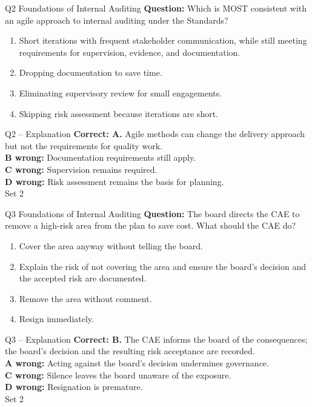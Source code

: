 \documentclass[aspectratio=169,10pt]{beamer}
\begin{document}
\begin{frame}[t]{Q2 \hfill {\scriptsize Foundations of Internal Auditing}}
	\small
	\textbf{Question:} Which is MOST consistent with an agile approach to internal auditing under the Standards?
	\begin{enumerate}[label=\Alph*.,itemsep=1pt,topsep=3pt]
			\item Short iterations with frequent stakeholder communication, while still meeting requirements for supervision, evidence, and documentation.
			\item Dropping documentation to save time.
			\item Eliminating supervisory review for small engagements.
			\item Skipping risk assessment because iterations are short.
	\end{enumerate}
\end{frame}

\begin{frame}[t]{Q2 -- Explanation}
	\footnotesize
	\textbf{Correct: A.} Agile methods can change the delivery approach but not the requirements for quality work. \\[5pt]
\textbf{B wrong:} Documentation requirements still apply. \\[3pt]
\textbf{C wrong:} Supervision remains required. \\[3pt]
\textbf{D wrong:} Risk assessment remains the basis for planning. \\[3pt]
	\vfill {\tiny Set 2}
\end{frame}

\begin{frame}[t]{Q3 \hfill {\scriptsize Foundations of Internal Auditing}}
	\small
	\textbf{Question:} The board directs the CAE to remove a high-risk area from the plan to save cost. What should the CAE do?
	\begin{enumerate}[label=\Alph*.,itemsep=1pt,topsep=3pt]
			\item Cover the area anyway without telling the board.
			\item Explain the risk of not covering the area and ensure the board's decision and the accepted risk are documented.
			\item Remove the area without comment.
			\item Resign immediately.
	\end{enumerate}
\end{frame}

\begin{frame}[t]{Q3 -- Explanation}
	\footnotesize
	\textbf{Correct: B.} The CAE informs the board of the consequences; the board's decision and the resulting risk acceptance are recorded. \\[5pt]
\textbf{A wrong:} Acting against the board's decision undermines governance. \\[3pt]
\textbf{C wrong:} Silence leaves the board unaware of the exposure. \\[3pt]
\textbf{D wrong:} Resignation is premature. \\[3pt]
	\vfill {\tiny Set 2}
\end{frame}
\end{document}

